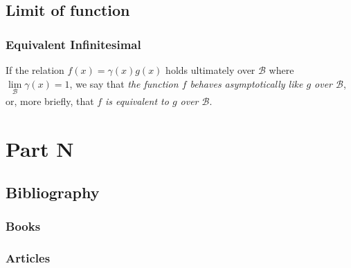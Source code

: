 \documentclass[11pt,fleqn]{book} %
\begin{document}


\chapter{Limit of function}

\section{Equivalent Infinitesimal}

\begin{definition}
If the relation $f(x)=\gamma(x)g(x)$ holds ultimately over $\mathcal{B}$ where $\lim\limits_{\mathcal{B}}{\gamma(x)}=1$, we say that \emph{the function $f$ behaves asymptotically like $g$ over $\mathcal{B}$}, or, more briefly, that $f$ \emph{is equivalent to $g$ over $\mathcal{B}$}.



\end{definition}


\part{Part N}




\chapter*{Bibliography}
\section*{Books}
\printbibliography[heading=bibempty,type=book]
\section*{Articles}
\printbibliography[heading=bibempty,type=article]



\cleardoublepage
{}
\setlength{\columnsep}{0.75cm}
\printindex

\end{document}
